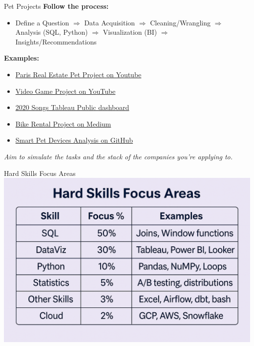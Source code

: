 \documentclass[10pt,a4paper]{article}
\begin{document}
\begin{multicols}{3}
\begin{textboxRed}{Pet Projects}
\textbf{Follow the process:}
\begin{itemize}
    \item Define a Question $\Rightarrow$ Data Acquisition $\Rightarrow$ Cleaning/Wrangling $\Rightarrow$ Analysis (SQL, Python) $\Rightarrow$ Visualization (BI) $\Rightarrow$ Insights/Recommendations
\end{itemize}
\textbf{Examples:}
\begin{itemize}
    \item \href{https://youtube.com/watch?v=HKuhMtrEgDE}{Paris Real Estate Pet Project on Youtube}
    \item \href{https://youtube.com/watch?v=HKuhMtrEgDE}{Video Game Project on YouTube} 
    \item \href{https://public.tableau.com/app/profile/ryansoares/viz/GoogleSearchTrendsMostSuccessfulSongsof2020/Dashboard}{2020 Songs Tableau Public dashboard} 
    \item \href{https://medium.com/@joseikwame/cyclistic-bike-share-analysis-case-study-99095c444505}{Bike Rental Project on Medium} 
    \item \href{https://github.com/amritachinnam/Customer-Data-Analytics-Power-BI}{Smart Pet Devices Analysis on GitHub}
\end{itemize}

\textit{Aim to simulate the tasks and the stack of the companies you’re applying to.}

\end{textboxRed}

\begin{textbox}{Hard Skills Focus Areas}
	\includegraphics[width=\textwidth]{table.png}
\end{textbox}


\end{multicols}
\end{document}
